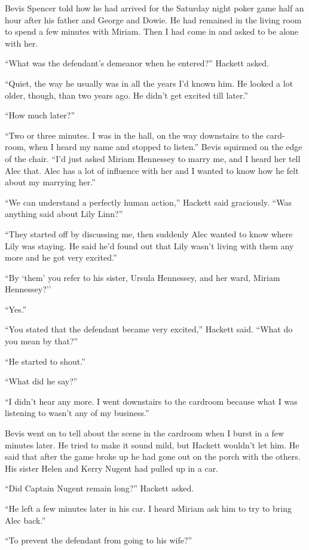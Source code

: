 \documentclass{novel}
\begin{document}
{Bevis Spencer told how he had arrived for the Saturday night poker game half an hour after his father and George and Dowie. He had remained in the living room to spend a few minutes with Miriam. Then I had come in and asked to be alone with her.

“What was the defendant’s demeanor when he entered?” Hackett asked.

“Quiet, the way he usually was in all the years I’d known him. He looked a lot older, though, than two years ago. He didn’t get excited till later.”

“How much later?”

“Two or three minutes. I was in the hall, on the way downstairs to the card-room, when I heard my name and stopped to listen.” Bevis squirmed on the edge of the chair. “I’d just asked Miriam Hennessey to marry me, and I heard her tell Alec that. Alec has a lot of influence with her and I wanted to know how he felt about my marrying her.”

“We can understand a perfectly human action,” Hackett said graciously. “Was anything said about Lily Linn?”

“They started off by discussing me, then suddenly Alec wanted to know where Lily was staying. He said he’d found out that Lily wasn’t living with them any more and he got very excited.”

“By ‘them’ you refer to his sister, Ursula Hennessey, and her ward, Miriam Hennessey?’’

“Yes.”

“You stated that the defendant became very excited,” Hackett said. “What do you mean by that?”

“He started to shout.”

“What did he say?”

“I didn’t hear any more. I went downstairs to the cardroom because what I was listening to wasn’t any of my business.”

Bevis went on to tell about the scene in the cardroom when I burst in a few minutes later. He tried to make it sound mild, but Hackett wouldn’t let him. He said that after the game broke up he had gone out on the porch with the others. His sister Helen and Kerry Nugent had pulled up in a car.

“Did Captain Nugent remain long?” Hackett asked.

“He left a few minutes later in his car. I heard Miriam ask him to try to bring Alec back.”

“To prevent the defendant from going to his wife?”

}
\end{document}
